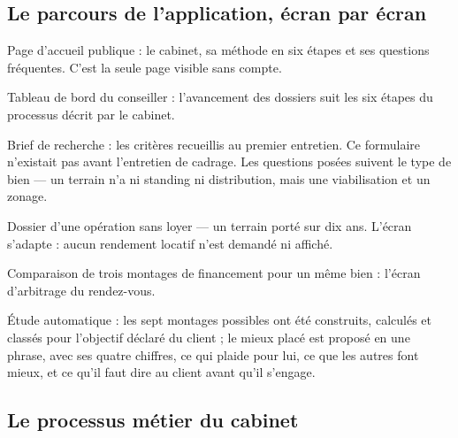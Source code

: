 \documentclass[12pt,a4paper]{article}
\begin{document}
\newpage
\appendix
{}
\renewcommand{\thesubsection}{\Alph{subsection}}
\setcounter{subsection}{0}

\subsection{Le parcours de l'application, écran par écran}

{Page d'accueil publique : le cabinet, sa méthode en six étapes et ses questions
	fréquentes. C'est la seule page visible sans compte.}{}

{Tableau de bord du conseiller : l'avancement des dossiers suit les six étapes du
	processus décrit par le cabinet.}{}

{Brief de recherche : les critères recueillis au premier entretien. Ce formulaire
	n'existait pas avant l'entretien de cadrage. Les questions posées suivent le
	type de bien --- un terrain n'a ni standing ni distribution, mais une
	viabilisation et un zonage.}{}

\newpage
{}
{Dossier d'une opération sans loyer --- un terrain porté sur dix ans. L'écran
	s'adapte : aucun rendement locatif n'est demandé ni affiché.}{}

{Comparaison de trois montages de financement pour un même bien : l'écran
	d'arbitrage du rendez-vous.}{}

\newpage
{}
{Étude automatique : les sept montages possibles ont été construits, calculés et
	classés pour l'objectif déclaré du client ; le mieux placé est proposé en une
	phrase, avec ses quatre chiffres, ce qui plaide pour lui, ce que les autres
	font mieux, et ce qu'il faut dire au client avant qu'il s'engage.}{}

\subsection{Le processus métier du cabinet}
\end{document}
